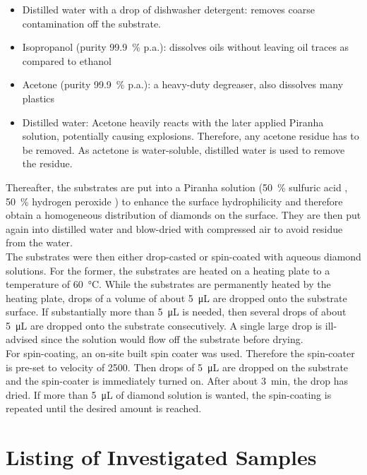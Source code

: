 	\begin{itemize}
		\item Distilled water with a drop of dishwasher detergent: removes coarse contamination off the substrate.
		\item Isopropanol (purity \SI{99.9}{\percent} p.a.): dissolves oils without leaving oil traces as compared to ethanol
		\item Acetone (purity \SI{99.9}{\percent} p.a.): a heavy-duty degreaser, also dissolves many plastics
		\item Distilled water: Acetone heavily reacts with the later applied Piranha solution, potentially causing explosions. Therefore, any acetone residue has to be removed. As actetone is water-soluble, distilled water is used to remove the residue. 
	\end{itemize}

	Thereafter, the substrates are put into a Piranha solution (\SI{50}{\percent} sulfuric acid , \SI{50}{\percent} hydrogen peroxide ) to enhance the surface hydrophilicity and therefore obtain a homogeneous distribution of diamonds on the surface.
	They are then put again into distilled water and blow-dried with compressed air to avoid residue from the water.
	\\
	The substrates were then either drop-casted or spin-coated with aqueous diamond solutions.
	For the former, the substrates are heated on a heating plate to a temperature of \SI{60}{\celsius}.
	While the substrates are permanently heated by the heating plate, drops of a volume of about \SI{5}{\micro\liter} are dropped onto the substrate surface.
	If substantially more than \SI{5}{\micro\liter} is needed, then several drops of about \SI{5}{\micro\liter} are dropped onto the substrate consecutively. A single large drop is ill-advised since the solution would flow off the substrate before drying.
	\\
	For spin-coating, an on-site built spin coater was used.
	Therefore the spin-coater is pre-set to  velocity of \SI{2500}{\rpm}.
	Then drops of \SI{5}{\micro\liter} are dropped on the substrate and the spin-coater is immediately turned on.
	After about \SI{3}{\minute}, the drop has dried.
	If more than \SI{5}{\micro\liter} of diamond solution is wanted, the spin-coating is repeated until the desired amount is reached.

\cleardoublepage
 \section[Samples List]{Listing of Investigated Samples}

